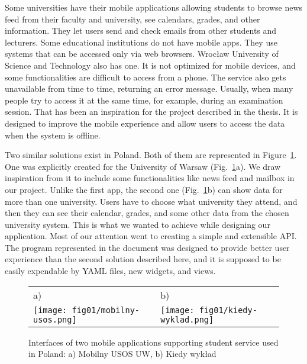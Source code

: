 Some universities have their mobile applications allowing students to browse news feed from their faculty and university, see calendars, grades, and other information. They let users send and check emails from other students and lecturers. Some educational institutions do not have mobile apps. They use systems that can be accessed only via web browsers. Wrocław University of Science and Technology also has one. It is not optimized for mobile devices, and some functionalities are difficult to access from a phone. The service also gets unavailable from time to time, returning an error message. Usually, when many people try to access it at the same time, for example, during an examination session. That has been an inspiration for the project described in the thesis. It is designed to improve the mobile experience and allow users to access the data when the system is offline.


Two similar solutions exist in Poland. Both of them are represented in Figure~\ref{fig:similar-solutions}. One was explicitly created for the University of Warsaw (Fig.~\ref{fig:similar-solutions}a). We draw inspiration from it to include some functionalities like news feed and mailbox in our project. Unlike the first app, the second one (Fig.~\ref{fig:similar-solutions}b) can show data for more than one university. Users have to choose what university they attend, and then they can see their calendar, grades, and some other data from the chosen university system. This is what we wanted to achieve while designing our application. Most of our attention went to creating a simple and extensible API. The program represented in the document was designed to provide better user experience than the second solution described here, and it is supposed to be easily expendable by YAML files, new widgets, and views.

\begin{figure}[htb]
    \centering
    \begin{tabular}{@{}ll@{}}
        a) & b) \\
        \texttt{[image: fig01/mobilny-usos.png]} &
        \texttt{[image: fig01/kiedy-wyklad.png]} \\
    \end{tabular}
    \caption{Interfaces of two mobile applications supporting student service used in Poland: a) Mobilny USOS UW, b) Kiedy wykład} \label{fig:similar-solutions}
\end{figure}

